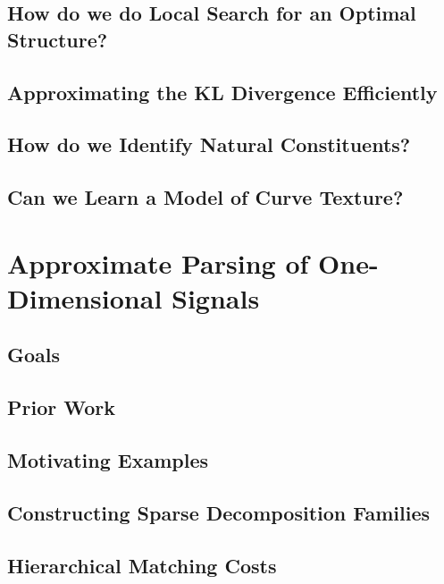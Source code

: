 \documentclass{book}
\begin{document}
  \section{How do we do Local Search for an Optimal Structure?}
    

  \section{Approximating the KL Divergence Efficiently}
    

  \section{How do we Identify Natural Constituents?}
    
    

  \section{Can we Learn a Model of Curve Texture?}
    

\chapter{Approximate Parsing of One-Dimensional Signals}
  \label{chap-sdf}

  \section{Goals}
    

  \section{Prior Work}

  \section{Motivating Examples}

  \section{Constructing Sparse Decomposition Families}

  \section{Hierarchical Matching Costs}
\end{document}
